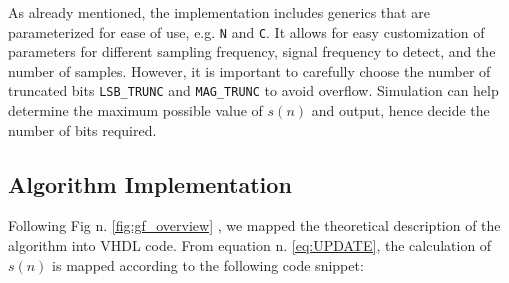 As already mentioned, the implementation includes generics that are parameterized for ease of use, e.g. \texttt{N} and \texttt{C}. It allows for easy customization of parameters for different sampling frequency, signal frequency to detect, and the number of samples. However, it is important to carefully choose the number of truncated bits \texttt{LSB\_TRUNC} and \texttt{MAG\_TRUNC} to avoid overflow. Simulation can help determine the maximum possible value of $s(n)$ and output, hence decide the number of bits required.

\subsection{Algorithm Implementation}
\label{sec:algo}
Following Fig n. \ref{fig:gf_overview} , we mapped the theoretical description of the algorithm into VHDL code.
From equation n. \ref{eq:UPDATE}, the calculation of $s(n)$ is mapped according to the following code snippet:

